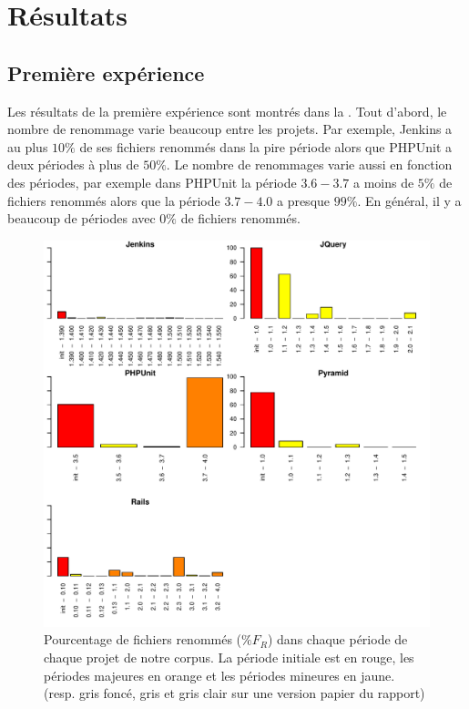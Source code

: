 \section{Résultats}
\label{sec:resultats}

\subsection{Première expérience}

Les résultats de la première expérience sont montrés dans la . Tout d'abord, le nombre de renommage varie beaucoup entre les projets. Par exemple, Jenkins a au plus $10\%$ de ses fichiers renommés dans la pire période alors que PHPUnit a deux périodes à plus de $50\%$. Le nombre de renommages varie aussi en fonction des périodes, par exemple dans PHPUnit la période $3.6 - 3.7$ a moins de $5\%$ de fichiers renommés alors que la période $3.7 - 4.0$ a presque $99\%$. En général, il y a beaucoup de périodes avec $0\%$ de fichiers renommés.\\

\begin{figure}[h]
	\centering
	\includegraphics[width=0.85\linewidth,keepaspectratio]{data/figures/renaming.pdf}
	\caption{Pourcentage de fichiers renommés ($\%F_R$) dans chaque période de chaque projet de notre corpus. La période initiale est en rouge, les périodes majeures en orange et les périodes mineures en jaune. (resp. gris foncé, gris et gris clair sur une version papier du rapport)}
	\label{fig:renaming}
\end{figure}

